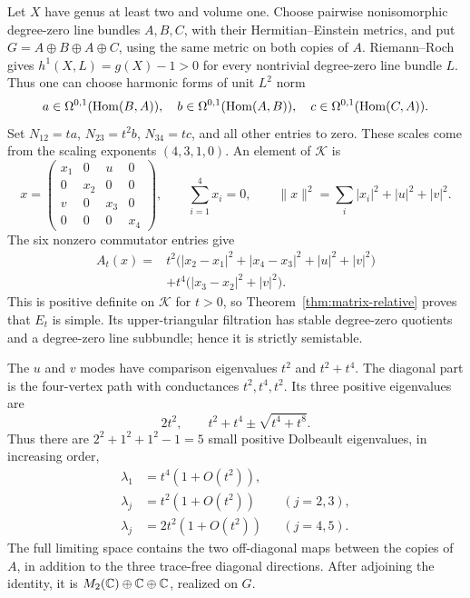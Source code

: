 Let $X$ have genus at least two and volume one. Choose pairwise
nonisomorphic degree-zero line bundles $A,B,C$, with their
Hermitian--Einstein metrics, and put
$G=A\oplus B\oplus A\oplus C$, using the same metric on both
copies of $A$. Riemann--Roch gives
$h^1(X,L)=g(X)-1>0$ for every nontrivial degree-zero line bundle
$L$. Thus one can choose harmonic forms of unit $L^2$ norm
\[
 a\in\Omega^{0,1}(\operatorname{Hom}(B,A)),\quad
 b\in\Omega^{0,1}(\operatorname{Hom}(A,B)),\quad
 c\in\Omega^{0,1}(\operatorname{Hom}(C,A)).
\]
Set $N_{12}=ta$, $N_{23}=t^2b$, $N_{34}=tc$, and all other entries
to zero. These scales come from the scaling exponents $(4,3,1,0)$. An element of
$\mathcal K$ is
\[
 x=\begin{pmatrix}
 x_1&0&u&0\\0&x_2&0&0\\v&0&x_3&0\\0&0&0&x_4
 \end{pmatrix},\qquad \sum_{i=1}^4x_i=0,
 \qquad \lVert x\rVert^2=\sum_i|x_i|^2+|u|^2+|v|^2.
\]
The six nonzero commutator entries give
\begin{equation}\label{eq:repeated-example-form}
 \begin{split}
 A_t(x)={}&t^2\bigl(|x_2-x_1|^2+|x_4-x_3|^2+|u|^2+|v|^2\bigr)\\
         &+t^4\bigl(|x_3-x_2|^2+|v|^2\bigr).
 \end{split}
\end{equation}
This is positive definite on $\mathcal K$ for $t>0$, so
Theorem~\ref{thm:matrix-relative} proves that $E_t$ is simple.
Its upper-triangular filtration has stable degree-zero quotients
and a degree-zero line subbundle; hence it is strictly semistable.

The $u$ and $v$ modes have comparison eigenvalues $t^2$ and
$t^2+t^4$. The diagonal part is the four-vertex path with
conductances $t^2,t^4,t^2$. Its three positive eigenvalues are
\[
 2t^2,\qquad t^2+t^4\pm\sqrt{t^4+t^8}.
\]
Thus there are $2^2+1^2+1^2-1=5$ small positive Dolbeault
eigenvalues, in increasing order,
\begin{equation}\label{eq:repeated-example-rates}
 \begin{aligned}
 \lambda_1&=t^4(1+O(t^2)),\\
 \lambda_j&=t^2(1+O(t^2))&& (j=2,3),\\
 \lambda_j&=2t^2(1+O(t^2))&& (j=4,5).
 \end{aligned}
\end{equation}
The full limiting space contains the two off-diagonal maps between
the copies of $A$, in addition to the three trace-free diagonal
directions. After adjoining the identity, it is
$M_2(\mathbb C)\oplus\mathbb C\oplus\mathbb C$, realized on $G$.

